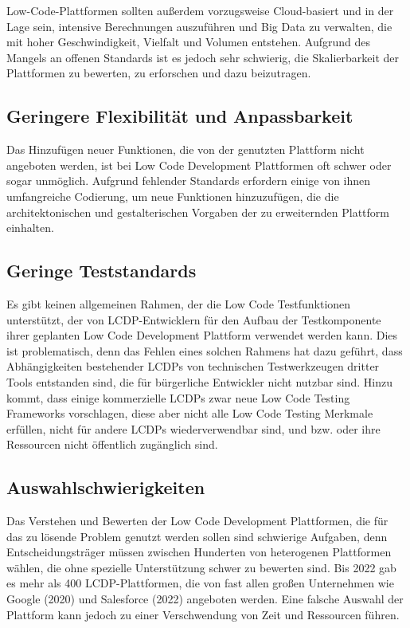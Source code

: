 \documentclass[12pt]{article} %
\begin{document}
	Low-Code-Plattformen sollten außerdem vorzugsweise Cloud-basiert und in der Lage sein, intensive Berechnungen auszuführen und Big Data zu verwalten, die mit hoher Geschwindigkeit, Vielfalt und Volumen entstehen. Aufgrund des Mangels an offenen Standards ist es jedoch sehr schwierig, die Skalierbarkeit der Plattformen zu bewerten, zu erforschen und dazu beizutragen. \autocite{Alamin.2023}
	
	\subsection{Geringere Flexibilität und Anpassbarkeit}	
	Das Hinzufügen neuer Funktionen, die von der genutzten Plattform nicht angeboten werden, ist bei Low Code Development Plattformen oft schwer oder sogar unmöglich. Aufgrund fehlender Standards erfordern einige von ihnen umfangreiche Codierung, um neue Funktionen hinzuzufügen, die die architektonischen und gestalterischen Vorgaben der zu erweiternden Plattform einhalten. \autocite{Alamin.2023}
	
	\subsection{Geringe Teststandards} 
	Es gibt keinen allgemeinen Rahmen, der die Low Code Testfunktionen unterstützt, der von LCDP-Entwicklern für den Aufbau der Testkomponente ihrer geplanten Low Code Development Plattform verwendet werden kann. Dies ist problematisch, denn das Fehlen eines solchen Rahmens hat dazu geführt, dass Abhängigkeiten bestehender LCDPs von technischen Testwerkzeugen dritter Tools entstanden sind, die für bürgerliche Entwickler nicht nutzbar sind. Hinzu kommt, dass einige kommerzielle LCDPs zwar neue Low Code Testing Frameworks vorschlagen, diese aber nicht alle  Low Code Testing Merkmale erfüllen, nicht für andere LCDPs wiederverwendbar sind, und bzw. oder ihre Ressourcen nicht öffentlich zugänglich sind. \autocite{Khorram.2020}
	
	\subsection{Auswahlschwierigkeiten}	
	Das Verstehen und Bewerten der Low Code Development Plattformen, die für das zu lösende Problem genutzt werden sollen sind schwierige Aufgaben, denn  Entscheidungsträger müssen zwischen Hunderten von heterogenen Plattformen wählen, die ohne spezielle Unterstützung schwer zu bewerten sind. Bis 2022 gab es mehr als 400 LCDP-Plattformen, die von fast allen großen Unternehmen wie Google (2020) und Salesforce (2022) angeboten werden. Eine falsche Auswahl der Plattform kann jedoch zu einer Verschwendung von Zeit und Ressourcen führen. \autocite{Alamin.2023}
	
\end{document}
